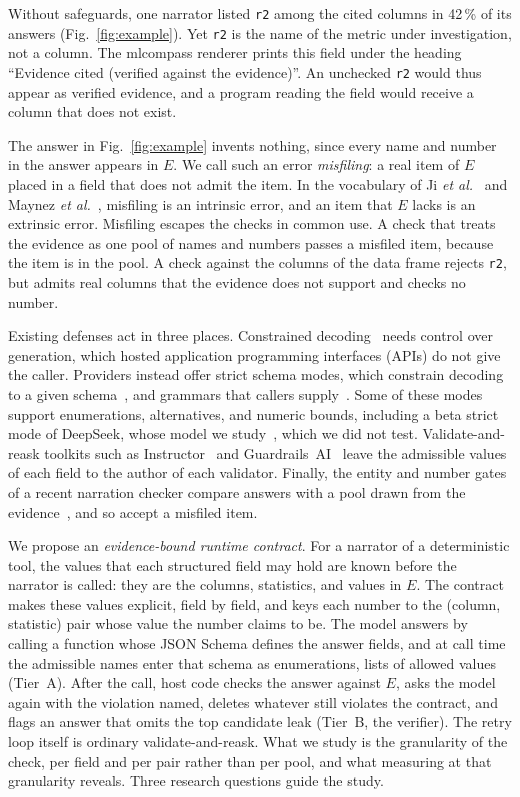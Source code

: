\documentclass[journal]{IEEEtran}
\begin{document}
Without safeguards, one narrator listed \texttt{r2} among the cited columns in
42\,\% of its answers (Fig.~\ref{fig:example}). Yet \texttt{r2} is the name of
the metric under investigation, not a column. The mlcompass renderer prints this
field under the heading ``Evidence cited (verified against the evidence)''. An
unchecked \texttt{r2} would thus appear as verified evidence, and a program
reading the field would receive a column that does not exist.

The answer in Fig.~\ref{fig:example} invents nothing, since every name and number
in the answer appears in $E$. We call such an error \emph{misfiling}: a real item
of $E$ placed in a field that does not admit the item. In the vocabulary of Ji
\emph{et al.}~\cite{ji} and Maynez \emph{et al.}~\cite{maynez2020faithfulness},
misfiling is an intrinsic error, and an item that $E$ lacks is an extrinsic error.
Misfiling escapes the checks in common use. A check that treats the evidence as
one pool of names and numbers passes a misfiled item, because the item is in the
pool. A check against the columns of the
data frame rejects \texttt{r2}, but admits real columns that the evidence does
not support and checks no number.

Existing defenses act in three places. Constrained
decoding~\cite{outlines,gcd,scholak2021picard} needs control over generation,
which hosted application programming interfaces (APIs) do not give the caller.
Providers instead offer strict schema modes, which constrain decoding to a given schema~\cite{structured}, and grammars that callers supply~\cite{openai2026functioncalling}. Some of these modes support
enumerations, alternatives, and numeric bounds, including a beta strict mode of DeepSeek, whose model we study~\cite{deepseek2026toolcalls}, which we did not
test. Validate-and-reask toolkits such as Instructor~\cite{liu2023instructor} and
Guardrails~AI~\cite{guardrailsai} leave the admissible values of each field to
the author of each validator. Finally, the entity and number gates of a recent
narration checker compare answers with a pool drawn from the
evidence~\cite{gupta2026veritygate}, and so accept a misfiled item.

We propose an \emph{evidence-bound runtime contract}. For a narrator of a
deterministic tool, the values that each structured field may hold are known
before the narrator is called: they are the columns, statistics, and values in
$E$. The contract makes these values explicit, field by field, and keys each
number to the (column, statistic) pair whose value the number claims to be. The model answers by calling a function whose JSON Schema defines the answer fields, and at call time the admissible names enter that schema as enumerations, lists of allowed values (Tier~A). After the call, host code checks the answer against $E$, asks the model
again with the violation named, deletes whatever still violates the contract,
and flags an answer that omits the top candidate leak (Tier~B, the verifier). The retry loop
itself is ordinary validate-and-reask. What we study is the granularity of the
check, per field and per pair rather than per pool, and what measuring at that
granularity reveals. Three research questions guide the study.
\end{document}
